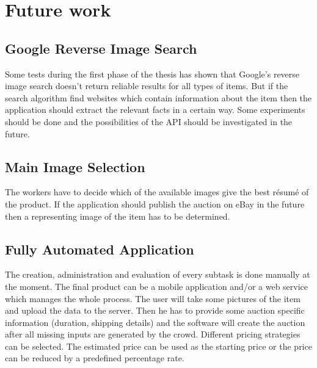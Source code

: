 \section{Future work}
\subsection{Google Reverse Image Search}
Some tests during the first phase of the thesis has shown that Google's reverse image search doesn't return reliable results for all types of items. But if the search algorithm find websites which contain information about the item then the application should extract the relevant facts in a certain way. Some experiments should be done and the possibilities of the API should be investigated in the future. 
\subsection{Main Image Selection}
The workers have to decide which of the available images give the best r\'{e}sum\'{e} of the product. If the application should publish the auction on eBay in the future then a representing image of the item has to be determined. 
\subsection{Fully Automated Application}
The creation, administration and evaluation of every subtask is done manually at the moment. The final product can be a mobile application and/or a web service which manages the whole process. The user will take some pictures of the item and upload the data to the server. Then he has to provide some auction specific information (duration, shipping details) and the software will create the auction after all missing inputs are generated by the crowd. Different pricing strategies can be selected. The estimated price can be used as the starting price or the price can be reduced by a predefined percentage rate. 
